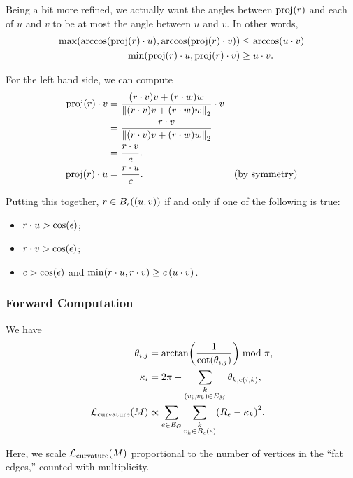Being a bit more refined, we actually want the angles between \(\proj\pof{r}\) and each of \(u\) and \(v\) to be at most the angle between \(u\) and \(v\). In other words, \begin{align*}
	\max\pof{\arccos\pof{\proj\pof{r} \cdot u}, \arccos\pof{\proj\pof{r} \cdot v}} &\le \arccos\pof{u \cdot v} \\
	\min\pof{\proj\pof{r} \cdot u, \proj\pof{r} \cdot v} &\ge u \cdot v.
\end{align*}

For the left hand side, we can compute
\begin{align*}
	\proj\pof{r} \cdot v &= \frac{\pof{r \cdot v}v + \pof{r \cdot w}w}{\norm{\pof{r \cdot v}v + \pof{r \cdot w}w}_2} \cdot v \\
		&= \frac{r \cdot v}{\norm{\pof{r \cdot v}v + \pof{r \cdot w}w}_2} \\
		&= \frac{r \cdot v}{c}. \\
	\proj\pof{r} \cdot u &= \frac{r \cdot u}{c}. & \text{(by symmetry)}
\end{align*}

Putting this together, \(r \in B_\epsilon\pof{\pof{u, v}}\) if and only if one of the following is true:
\begin{itemize}
	\item
	\(r \cdot u > \cos\pof{\epsilon}\);
	\item
	\(r \cdot v > \cos\pof{\epsilon}\);
	\item
	\(c > \cos\pof{\epsilon}\) and \(\min\pof{r \cdot u, r \cdot v} \ge c\,\pof{u \cdot v}\).
\end{itemize}

\subsubsection{Forward Computation}
We have \begin{align*}
	\theta_{i, j} &= \arctan\pof{\frac{1}{\cot\pof{\theta_{i, j}}}} \bmod \pi, \\
	\kappa_i &= 2\pi - \sum_{\substack{k \\ \pof{v_i, v_k} \in E_M}} \theta_{k, c\pof{i, k}}, \\
	\mathcal{L}_{\mathrm{curvature}}\pof{M} &\propto \sum_{e \in E_G} \sum_{\substack{k \\ v_k \in B_\epsilon\pof{e}}} \pof{R_e - \kappa_k}^2.
\end{align*}

Here, we scale \(\mathcal{L}_{\mathrm{curvature}}\pof{M}\) proportional to the number of vertices in the ``fat edges,'' counted with multiplicity.

